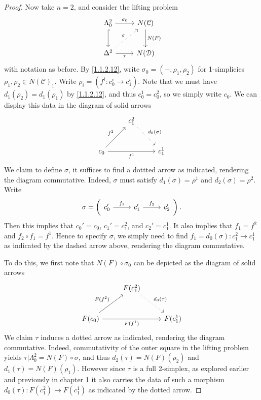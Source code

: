 \begin{proof}
	Now take $n=2$, and consider the lifting problem
	\[\begin{tikzcd}[row sep = 2.5em, column sep = 2.5em]
	\Lambda _0^2 \ar[" \sigma _0 ", r] \ar[hook, d]  & N(\mathcal{C} )\ar[" N(F) ", d]  \\
	\Delta ^2 \ar[" \tau  "', r] \ar[" \sigma  ", dotted, ur]  & N(\mathcal{D} )
	\end{tikzcd}\]
	with notation as before. By \cref{1.1.2.12}, write $\sigma _0=(-,\rho _1,\rho _2)$ for 1-simplicies $\rho _1,\rho _2\in N(\mathcal{C} )_1$. Write $\rho _i = (f^i : c_0^i \to c_1^i)$. Note that we must have $d_1(\rho _2)=d_1(\rho _1)$ by \cref{1.1.2.12}, and thus $c_0^1=c_0^2$, so we simply write $c_0$. We can display this data in the diagram of solid arrows
	\[\begin{tikzcd}[row sep = 2.5em, column sep = 2.5em]
	 & c_1^2 \ar[" d_0(\sigma ) ", dotted, dr]  &  \\
	c_0 \ar[" f^2 ", ur] \ar[" f^1 "', rr]  &  & c_1^1
	\end{tikzcd}\]
	We claim to define $\sigma $, it suffices to find a dottted arrow as indicated, rendering the diagram commutative. Indeed, $\sigma $ must satisfy $d_1(\sigma )=\rho ^1$ and $d_2(\sigma )=\rho ^2$. Write
	\[\sigma =\left(\begin{tikzcd}[row sep = 2.5em, column sep = 2.5em]
	c_0' \ar[" f_1 ", r]  & c_1' \ar[" f_2 ", r]  & c_2'
	\end{tikzcd}\right).\]
	Then this implies that $c_0'=c_0$, $c_1'=c_1^2$, and $c_2'=c_1^1$. It also implies that $f_1=f^2$ and $f_2\circ f_1 = f^1$. Hence to specify $\sigma $, we simply need to find $f_1 = d_0(\sigma ) : c_1^2 \to c_1^1$ as indicated by the dashed arrow above, rendering the diagram commutative.

	To do this, we first note that $N(F)\circ \sigma _0$ can be depicted as the diagram of solid arrows
	\[\begin{tikzcd}[row sep = 2.5em, column sep = 2.5em]
	 & F(c_1^2)\ar[" d_0(\tau ) ", dotted, dr]  &  \\
	F(c_0)\ar[" F(f^2) ", ur] \ar[" F(f^1) "', rr]  &  & F(c_1^1)
	\end{tikzcd}\]
	We claim $\tau $ induces a dotted arrow as indicated, rendering the diagram commutative. Indeed, commutativity of the outer square in the lifting problem yields $\tau |\Lambda _0^2=N(F)\circ \sigma $, and thus $d_2(\tau )=N(F)(\rho _2)$ and $d_1(\tau )=N(F)(\rho _1)$. However since $\tau $ is a full 2-simplex, as explored earlier and previously in chapter 1 it also carries the data of such a morphism $d_0(\tau ): F(c_1^2) \to F(c_1^1)$ as indicated by the dotted arrow.


\end{proof}

